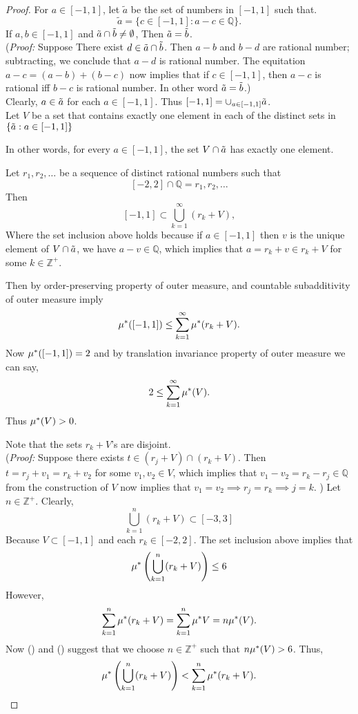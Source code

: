 \begin{proof}
    For $a\in[-1,1]$, let  $\tilde{a}$ be the set of numbers in  $[-1,1]$ such that.
     \[
         \tilde{a}=\{c\in[-1,1]:a-c\in\mathds{Q}\}.
    \]
    If $a,b\in[-1,1]$ and  $\tilde{a}\cap\tilde{b}\neq \emptyset$, Then $\tilde{a}=\tilde{b}$.\\
    (\textit{Proof: } Suppose There exist $d\in\tilde{a}\cap\tilde{b}$. Then  $a-b$ and  $b-d$ are rational number; subtracting, we conclude that 
    $a-d$ is rational number. The equitation $a-c=(a-b)+(b-c)$ now implies that if  $c\in[-1,1]$, then $a-c$ is rational iff $b-c$ is rational number.
    In other word  $\tilde{a}=\tilde{b}$.)\\
    Clearly, $a\in\tilde{a}$ for each  $a\in[-1,1]$. Thus $[-1,1]=\cup_{a\in[-1,1]}\tilde{a}$.\\
    Let $V$ be a set that contains exactly one element in each of the distinct sets in  $\{\tilde{a}:a\in[-1,1]\}$

    In other words, for every  $a\in[-1,1]$, the set  $V\cap\tilde{a}$ has exactly one element.

    Let  $r_1,r_2,\ldots$ be a sequence of distinct rational numbers such that
    \[
        [-2,2]\cap\mathds{Q}={r_1,r_2,\ldots}
    \]
    Then
    \[
        [-1,1]\subset \bigcup_{k=1}^{\infty}(r_k+V),
    \]
    Where the set inclusion above holds because if $a\in[-1,1]$ then  $v$ is the unique element of  $V\cap\tilde{a}$, we have $a-v\in\mathds{Q}$, which implies that $a=r_k+v\in r_k+V$ for some  $k\in\mathds{Z}^{+}$.

    Then by order-preserving property of outer measure, and countable subadditivity of outer measure imply
    \[
        \mu^{*}([-1,1])\le \sum_{k=1}^{\infty}\mu^{*}(r_k+V).
    \]
    Now $\mu^{*}([-1,1])=2$ and by translation invariance property of outer measure we can say,
     \[
         2\le \sum_{k=1}^{\infty}\mu^{*}(V).
    \]
    Thus $\mu^{*}(V)>0$.

    Note that the sets  $r_k+V$'s are disjoint.\\
    (\textit{Proof:} Suppose there exists $t\in(r_j+V)\cap(r_k+V)$. Then $t=r_j+v_1=r_k+v_2$ for some  $v_1,v_2\in V$, which implies that  $v_1-v_2=r_k-r_j\in\mathds{Q}$ from the construction of $V$ now implies that  $v_1=v_2\implies r_j=r_k\implies j=k$. ) 
    Let $n\in\mathds{Z}^{+}$. Clearly,
    \[
        \bigcup_{k=1}^{n}(r_k+V)\subset [-3,3]
    \]
    Because $V\subset [-1,1]$ and each  $r_k\in[-2,2]$. The set inclusion above implies that
     \begin{equation}
         \label{less6}
         \mu^{*}\left(\bigcup_{k=1}^{n}(r_k+V)\right)\le 6 
    \end{equation}
    However,
    \begin{equation}
        \label{nV}
        \sum_{k=1}^{n}\mu^{*}(r_k+V)=\sum_{k=1}^{n}\mu^{*}{V}=n\mu^{*}(V).
    \end{equation}
    Now () and  () suggest that we choose $n\in\mathds{Z}^{+}$ such that $n\mu^{*}(V)>6$. Thus,
     \begin{equation}
        \label{contra}
         \mu^{*}\left( \bigcup_{k=1}^{n}(r_k+V) \right) <\sum_{k=1}^{n}\mu^{*}(r_k+V).
    \end{equation}


\end{proof}
